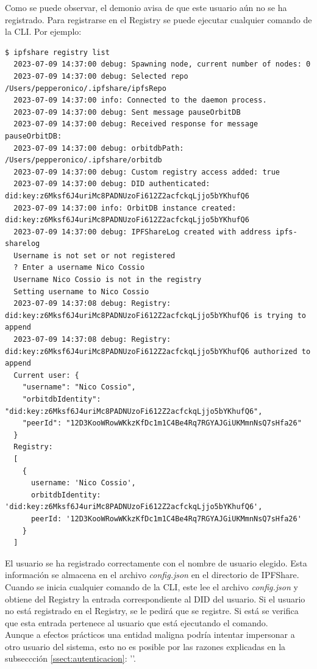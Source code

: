 Como se puede observar, el demonio avisa de que este usuario aún no se ha registrado. Para registrarse en el Registry se puede ejecutar cualquier comando
de la CLI. Por ejemplo:

\begin{verbatim}
$ ipfshare registry list
  2023-07-09 14:37:00 debug: Spawning node, current number of nodes: 0
  2023-07-09 14:37:00 debug: Selected repo /Users/pepperonico/.ipfshare/ipfsRepo
  2023-07-09 14:37:00 info: Connected to the daemon process.
  2023-07-09 14:37:00 debug: Sent message pauseOrbitDB
  2023-07-09 14:37:00 debug: Received response for message pauseOrbitDB:
  2023-07-09 14:37:00 debug: orbitdbPath: /Users/pepperonico/.ipfshare/orbitdb
  2023-07-09 14:37:00 debug: Custom registry access added: true
  2023-07-09 14:37:00 debug: DID authenticated: did:key:z6Mksf6J4uriMc8PADNUzoFi612Z2acfckqLjjo5bYKhufQ6
  2023-07-09 14:37:00 info: OrbitDB instance created: did:key:z6Mksf6J4uriMc8PADNUzoFi612Z2acfckqLjjo5bYKhufQ6
  2023-07-09 14:37:00 debug: IPFShareLog created with address ipfs-sharelog
  Username is not set or not registered
  ? Enter a username Nico Cossio
  Username Nico Cossio is not in the registry 
  Setting username to Nico Cossio
  2023-07-09 14:37:08 debug: Registry: did:key:z6Mksf6J4uriMc8PADNUzoFi612Z2acfckqLjjo5bYKhufQ6 is trying to append
  2023-07-09 14:37:08 debug: Registry: did:key:z6Mksf6J4uriMc8PADNUzoFi612Z2acfckqLjjo5bYKhufQ6 authorized to append
  Current user: {
    "username": "Nico Cossio",
    "orbitdbIdentity": "did:key:z6Mksf6J4uriMc8PADNUzoFi612Z2acfckqLjjo5bYKhufQ6",
    "peerId": "12D3KooWRowWKkzKfDc1m1C4Be4Rq7RGYAJGiUKMmnNsQ7sHfa26"
  }
  Registry:
  [
    {
      username: 'Nico Cossio',
      orbitdbIdentity: 'did:key:z6Mksf6J4uriMc8PADNUzoFi612Z2acfckqLjjo5bYKhufQ6',
      peerId: '12D3KooWRowWKkzKfDc1m1C4Be4Rq7RGYAJGiUKMmnNsQ7sHfa26'
    }
  ]
\end{verbatim}

El usuario se ha registrado correctamente con el nombre de usuario elegido. Esta información se almacena en el archivo \textit{config.json} en el directorio de IPFShare. Cuando se inicia cualquier comando de la CLI, este lee el archivo \textit{config.json} y obtiene del Registry
la entrada correspondiente al DID del usuario. Si el usuario no está registrado en el Registry, se le pedirá que se registre. Si está se verifica
que esta entrada pertenece al usuario que está ejecutando el comando.
\\ Aunque a efectos prácticos una entidad maligna podría intentar impersonar a otro usuario del sistema, esto no es posible por las razones explicadas en
la subseccción \ref{ssect:autenticacion}: ''.

